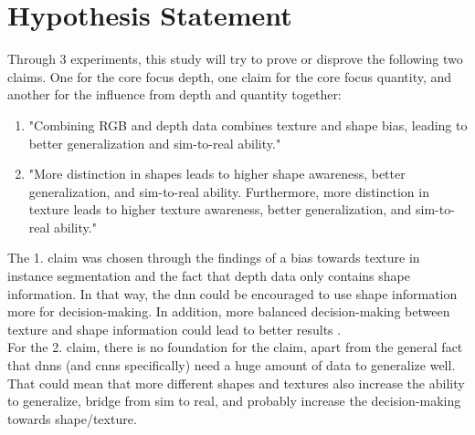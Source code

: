 	
	\section{Hypothesis Statement}
	\label{sec:hypothesis-statement}	
		Through 3 experiments, this study will try to prove or disprove the following two claims. One for the core focus depth, one claim for the core focus quantity, and another for the influence from depth and quantity together: 
		\begin{enumerate}
			\item "Combining RGB and depth data combines texture and shape bias, leading to better generalization and sim-to-real ability." %
			\item "More distinction in shapes leads to higher shape awareness, better generalization, and sim-to-real ability. Furthermore, more distinction in texture leads to higher texture awareness, better generalization, and sim-to-real ability."
		\end{enumerate}
		The 1. claim was chosen through the findings of a bias towards texture in instance segmentation \cite{Theodoridis2022} and the fact that depth data only contains shape information. In that way, the \ac{dnn} could be encouraged to use shape information more for decision-making. In addition, more balanced decision-making between texture and shape information could lead to better results \cite{Li2021}\cite{Co2021}\cite{Chung2023}.\\
		For the 2. claim, there is no foundation for the claim, apart from the general fact that \ac{dnn}s (and \ac{cnn}s specifically) need a huge amount of data to generalize well. That could mean that more different shapes and textures also increase the ability to generalize, bridge from sim to real, and probably increase the decision-making towards shape/texture.\\
	
	



			